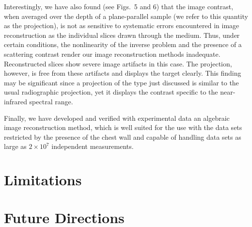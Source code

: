 Interestingly, we have also found (see Figs.~5 and 6) that the image contrast,
when averaged over the depth of a plane-parallel sample (we refer to
this quantity as the projection), is not as sensitive to
systematic errors encountered in image reconstruction as the
individual slices drawn through the medium. Thus, under certain
conditions, the nonlinearity of the inverse problem and the presence
of a scattering contrast render our image reconstruction methods
inadequate. Reconstructed slices show severe image artifacts in this
case. The projection, however, is free from these artifacts and
displays the target clearly. This finding may be significant since a
projection of the type just discussed is similar to the usual
radiographic projection, yet it displays the contrast specific to the
near-infrared spectral range.

Finally, we have developed and verified with experimental data an algebraic 
image reconstruction method, which is well suited for the use with the data 
sets restricted by the presence of the chest wall and capable of handling 
data sets as large as $2\times 10^7$ independent measurements.

\section{Limitations}

\section{Future Directions}
